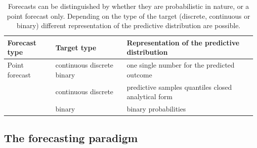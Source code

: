 \documentclass[article,shortnames]{jss}\usepackage[]{graphicx}\usepackage[]{color}
\begin{document}
\begin{table}[h!]
\centering

\begin{longtable}[t]{>{\raggedright\arraybackslash}p{3.5cm}>{\raggedright\arraybackslash}p{2.5cm}>{\raggedright\arraybackslash}p{4.5cm}}
\toprule
\textbf{Forecast type} & \textbf{Target type} & \textbf{Representation of the predictive distribution}\\
\midrule
Point forecast & continuous \newline  discrete \newline  binary & one single number for the predicted outcome\\
\cmidrule{1-3}\pagebreak[0]
 & continuous \newline  discrete & predictive samples \newline   quantiles \newline   closed analytical form\\
\cmidrule{2-3}\nopagebreak
\multirow{-2}{3.5cm}{\raggedright\arraybackslash Probabilistic forecast} & binary & binary probabilities\\
\bottomrule
\end{longtable}


\caption{\label{tab:forecast-types} Forecasts can be distinguished by whether they are probabilistic in nature, or a point forecast only. Depending on the type of the target (discrete, continuous or binary) different representation of the predictive distribution are possible.} 
\end{table}


\subsection{The forecasting paradigm}
\end{document}
